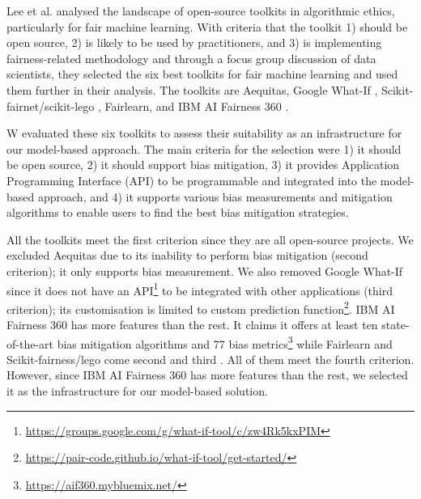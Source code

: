 \documentclass[sigconf,review]{acmart}
\begin{document}
{	Lee et al. \cite{lee2021landscape} analysed the landscape of open-source toolkits in algorithmic ethics, particularly for fair machine learning. With criteria that the toolkit 1) should be open source, 2) is likely to be used by practitioners, and 3) is implementing fairness-related methodology and through a focus group discussion of data scientists, they selected the six best toolkits for fair machine learning and used them further in their analysis. The toolkits are Aequitas\cite{saleiro2019aequitas}, Google What-If \cite{googlewhatif2020}, Scikit-fairnet/scikit-lego \cite{scikitfairness2022,scikitlego2022}, Fairlearn\cite{bird2020fairlearn}, and IBM AI Fairness 360 \cite{bellamy2018ai}.  
	
	W evaluated these six toolkits to assess their suitability as an infrastructure for our model-based approach. The main criteria for the selection were 1) it should be open source, 2) it should support bias mitigation, 3) it provides Application Programming Interface (API) to be programmable and integrated into the model-based approach, and 4) it supports various bias measurements and mitigation algorithms to enable users to find the best bias mitigation strategies. 
	
	All the toolkits meet the first criterion since they are all open-source projects. We excluded Aequitas due to its inability to perform bias mitigation (second criterion); it only supports bias measurement. We also removed Google What-If since it does not have an API\footnote{\url{https://groups.google.com/g/what-if-tool/c/zw4Rk5kxPIM}} to be integrated with other applications (third criterion); its customisation is limited to custom prediction function\footnote{\url{https://pair-code.github.io/what-if-tool/get-started/}}. IBM AI Fairness 360 has more features than the rest. It claims it offers at least ten state-of-the-art bias mitigation algorithms and 77 bias metrics\footnote{\url{https://aif360.mybluemix.net/}} while Fairlearn and Scikit-fairness/lego come second and third \cite{lee2021landscape}. All of them meet the fourth criterion. However, since IBM AI Fairness 360 has more features than the rest, we selected it as the infrastructure for our model-based solution.
	
	
	
}
\end{document}
